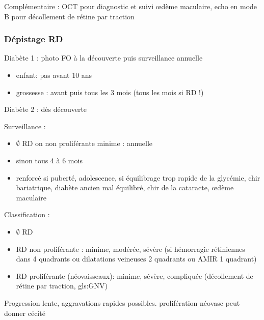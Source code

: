 \documentclass[11pt]{article}
\begin{document}
Complémentaire : OCT pour diagnostic et suivi \oe{}dème maculaire, echo en mode B
pour décollement de rétine par traction

\subsubsection{Dépistage RD}
\label{sec:org336e7d5}
Diabète 1 : photo FO à la découverte puis surveillance annuelle
\begin{itemize}
\item enfant: pas avant 10 ans
\item grossesse : avant puis tous les 3 mois (tous les mois si RD !)
\end{itemize}
Diabète 2 : dès découverte

Surveillance :
\begin{itemize}
\item \(\emptyset\) RD on non proliférante minime : annuelle
\item sinon tous 4 à 6 mois
\item renforcé si puberté, adolescence, si équilibrage trop rapide de la glycémie,
chir bariatrique, diabète ancien mal équilibré, chir de la cataracte,
\oe{}dème maculaire
\end{itemize}

Classification :
\begin{itemize}
\item \(\emptyset\) RD
\item RD non proliférante : minime, modérée, sévère (si hémorragie rétiniennes dans 4
quadrants ou dilatations veineuses 2 quadrants ou AMIR 1 quadrant)
\item RD proliférante (néovaisseaux): minime, sévère, compliquée (décollement de
rétine par traction, gls:GNV)
\end{itemize}

Progression lente, aggravations rapides possibles. \danger prolifération néovasc
peut donner cécité 
\end{document}
